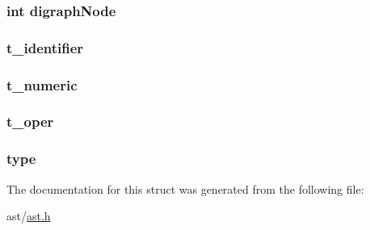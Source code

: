 \subsubsection[{\texorpdfstring{digraph\+Node}{digraphNode}}]{\setlength{\rightskip}{0pt plus 5cm}int digraph\+Node}\hypertarget{structnode_type_tag_a6b7a1b1e36c87652f87e4f6213d58359}{}\label{structnode_type_tag_a6b7a1b1e36c87652f87e4f6213d58359}
\subsubsection[{\texorpdfstring{t\+\_\+identifier}{t_identifier}}]{ t\+\_\+identifier}\hypertarget{structnode_type_tag_a02bb0284bffb88e6a4cee581a891e540}{}\label{structnode_type_tag_a02bb0284bffb88e6a4cee581a891e540}
\subsubsection[{\texorpdfstring{t\+\_\+numeric}{t_numeric}}]{ t\+\_\+numeric}\hypertarget{structnode_type_tag_afc977737cf4a23085551f9fa013a4691}{}\label{structnode_type_tag_afc977737cf4a23085551f9fa013a4691}
\subsubsection[{\texorpdfstring{t\+\_\+oper}{t_oper}}]{ t\+\_\+oper}\hypertarget{structnode_type_tag_ac7bb317a3d1980651b962f891f162462}{}\label{structnode_type_tag_ac7bb317a3d1980651b962f891f162462}
\subsubsection[{\texorpdfstring{type}{type}}]{ type}\hypertarget{structnode_type_tag_ab60be6a5113c8fd8928ef6bf82580818}{}\label{structnode_type_tag_ab60be6a5113c8fd8928ef6bf82580818}


The documentation for this struct was generated from the following file\+:\begin{DoxyCompactItemize}
\item 
ast/\hyperlink{ast_8h}{ast.\+h}\end{DoxyCompactItemize}

